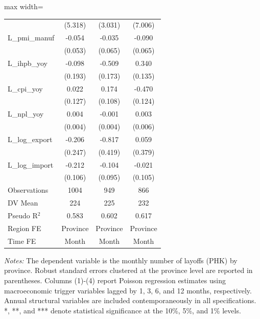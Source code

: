 \begin{table}[H]
\begin{adjustbox}{max width=\textwidth}
\begin{tabular}{l*{3}{c}}
            &     (5.318)         &     (3.031)         &     (7.006)         \\
L\_pmi\_manuf &      -0.054         &      -0.035         &      -0.090         \\
            &     (0.053)         &     (0.065)         &     (0.065)         \\
L\_ihpb\_yoy  &      -0.098         &      -0.509\sym{**} &       0.340\sym{*}  \\
            &     (0.193)         &     (0.173)         &     (0.135)         \\
L\_cpi\_yoy   &       0.022         &       0.174         &      -0.470\sym{***}\\
            &     (0.127)         &     (0.108)         &     (0.124)         \\
L\_npl\_yoy   &       0.004         &      -0.001         &       0.003         \\
            &     (0.004)         &     (0.004)         &     (0.006)         \\
L\_log\_export&      -0.206         &      -0.817         &       0.059         \\
            &     (0.247)         &     (0.419)         &     (0.379)         \\
L\_log\_import&      -0.212\sym{*}  &      -0.104         &      -0.021         \\
            &     (0.106)         &     (0.095)         &     (0.105)         \\
\midrule
Observations&        1004         &         949         &         866         \\
DV Mean     &         224         &         225         &         232         \\
Pseudo R$^2$&       0.583         &       0.602         &       0.617         \\
Region FE   &    Province         &    Province         &    Province         \\
Time FE     &       Month         &       Month         &       Month         \\
\bottomrule
\end{tabular}
\end{adjustbox}
\begin{tablenotes}
\footnotesize
\item \textit{Notes:} The dependent variable is the monthly number of layoffs (PHK) by province. Robust standard errors clustered at the province level are reported in parentheses. Columns (1)-(4) report Poisson regression estimates using macroeconomic trigger variables lagged by 1, 3, 6, and 12 months, respectively. Annual structural variables are included contemporaneously in all specifications. *, **, and *** denote statistical significance at the 10\%, 5\%, and 1\% levels.
\end{tablenotes}
\end{table}
